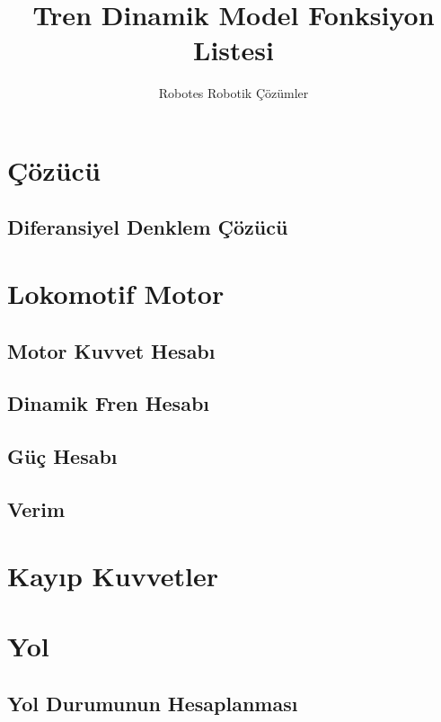 \documentclass[10pt,a4paper]{article}
\author{Robotes Robotik Çözümler}
\title{Tren Dinamik Model Fonksiyon Listesi}
\begin{document}
\maketitle
\newpage

\tableofcontents
\newpage

\section{Çözücü}

\subsection{Diferansiyel Denklem Çözücü}


\newpage
\section{Lokomotif Motor}

\subsection{Motor Kuvvet Hesabı}

\subsection{Dinamik Fren Hesabı}

\subsection{Güç Hesabı}

\subsection{Verim}

\newpage
\section{Kayıp Kuvvetler}


\newpage
\section{Yol}

\subsection{Yol Durumunun Hesaplanması}
\end{document}
